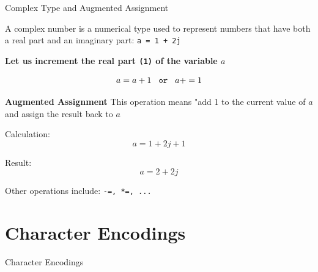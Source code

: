 \documentclass[
	11pt, 
]{beamer}
\begin{document}

\begin{frame}[fragile]{Complex Type and Augmented Assignment} %

A complex number is a numerical type used to represent numbers that have both a real part and an imaginary part: \texttt{a = 1 + 2j}

\vspace{.1cm}

\textbf{Let us increment the real part \texttt{(1)} of the variable $a$}

\[
a = a + 1 \hspace{.3cm} \texttt{or} \hspace{.3cm} a+= 1
\]

\begin{exampleblock}{\textbf{Augmented Assignment}}
This operation means "add 1 to the current value of $a$ and assign the result back to $a$ 
\end{exampleblock}

\vspace{.12cm}

Calculation:
\[
a = 1 + 2j + 1
\]

Result:
\[
a = 2 + 2j
\]

Other operations include: \hspace{.1cm} \texttt{-=, *=, ...}

\end{frame}


\section{Character Encodings}
\begin{frame}{Character Encodings}





    
\end{frame}

\end{document}
